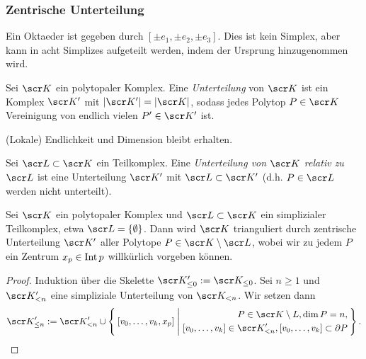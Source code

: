
\subsubsection{Zentrische Unterteilung}



Ein Oktaeder ist gegeben durch $[\pm e_1, \pm e_2, \pm e_3]$.
Dies ist kein Simplex, aber kann in acht Simplizes aufgeteilt werden, indem der Ursprung hinzugenommen wird.

\begin{df}
	Sei $\scr K$ ein polytopaler Komplex.
	Eine \emph{Unterteilung} von $\scr K$ ist ein Komplex $\scr K'$ mit $|\scr K'| = |\scr K|$, sodass jedes Polytop $P \in \scr K$ Vereinigung von endlich vielen $P' \in \scr K'$ ist.
	\begin{note}
		(Lokale) Endlichkeit und Dimension bleibt erhalten.
	\end{note}
\end{df}

\begin{df}
	Sei $\scr L \subset \scr K$ ein Teilkomplex.
	Eine \emph{Unterteilung von $\scr K$ relativ zu $\scr L$} ist eine Unterteilung $\scr K'$ mit $\scr L \subset \scr K'$ (d.h. $P \in \scr L$ werden nicht unterteilt).
\end{df}

\begin{st}
	Sei $\scr K$ ein polytopaler Komplex und $\scr L \subset \scr K$ ein simplizialer Teilkomplex, etwa $\scr L = \{\emptyset\}$.
	Dann wird $\scr K$ trianguliert durch zentrische Unterteilung $\scr K'$ aller Polytope $P \in \scr K \setminus \scr L$, wobei wir zu jedem $P$ ein Zentrum $x_p \in \operatorname{Int} p$ willkürlich vorgeben können.
	\begin{proof}
		Induktion über die Skelette $\scr K_{\le 0}' := \scr K_{\le 0}$.
		Sei $n \ge 1$ und $\scr K'_{<n}$ eine simpliziale Unterteilung von $\scr K_{<n}$.
		Wir setzen dann
		\[
			\scr K_{\le n}'
			:= \scr K_{<n}' \cup
			\Set{ [v_0,\dotsc, v_k, x_p] |
				\begin{aligned}
					P \in \scr K \setminus L, \dim P = n, \\
					[v_0, \dotsc, v_k] \in \scr K'_{<n},
					[v_0, \dotsc, v_k] \subset \boundary P
				\end{aligned}}.
		\]
	\end{proof}
\end{st}


